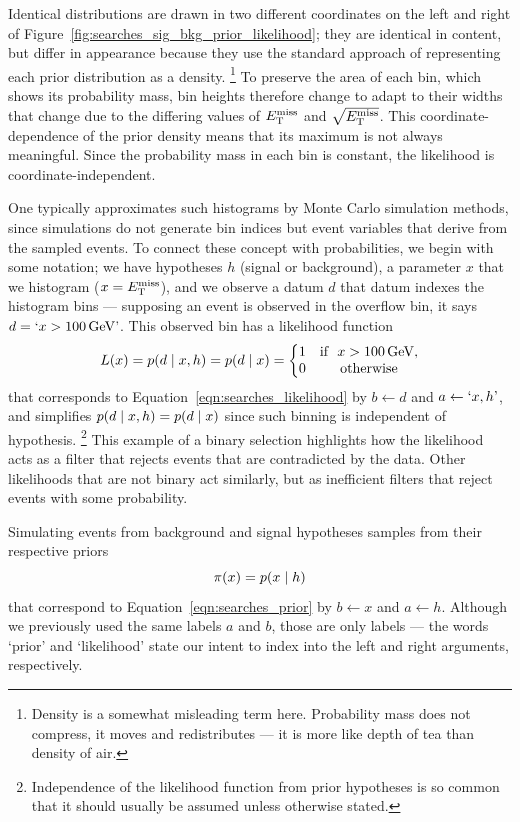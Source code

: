 Identical distributions are drawn in two different coordinates
on the left and right of Figure~\ref{fig:searches_sig_bkg_prior_likelihood};
they are identical in content, but differ in appearance because they use the
standard approach of representing each prior distribution as a density.%
\footnote{%
Density is a somewhat misleading term here.
Probability mass does not compress, it moves and redistributes --- it is more
like depth of tea than density of air.%
}
To preserve the area of each bin, which shows its probability mass,
bin heights therefore change to adapt to their widths that change due to the
differing values of $\met$ and $\sqrt{\met}$.
This coordinate-dependence of the prior density means that its maximum is
not always meaningful.
Since the probability mass in each bin is constant, the likelihood is
coordinate-independent.

One typically approximates such histograms by Monte Carlo simulation methods,
since simulations do not generate bin indices but event variables that derive
from the sampled events.
To connect these concept with probabilities, we begin with some notation;
we have hypotheses $h$ (signal or background),
a parameter $x$ that we histogram ($x = \met$),
and we observe a datum $d$ that datum indexes the histogram bins --- supposing
an event is observed in the overflow bin, it says
$d = `x > 100\,\eV[G]\textrm{'}$.
This observed bin has a likelihood function
\begin{equation}
L(x) = \prob{d}{x, h} = \prob{d}{x} =
\left\{
\begin{matrix}
1 & \textrm{if }~x > 100\,\eV[G], \\
0 & \textrm{otherwise} \\
\end{matrix}
\right.
\end{equation}
that corresponds to Equation~\ref{eqn:searches_likelihood} by
$b \leftarrow d$ and $a \leftarrow `x, h\textrm{'}$,
and simplifies $\prob{d}{x, h} = \prob{d}{x}$ since such binning is independent
of hypothesis.%
\footnote{%
Independence of the likelihood function from prior hypotheses is so common
that it should usually be assumed unless otherwise stated.
}
This example of a binary selection highlights how the likelihood acts as a
filter that rejects events that are contradicted by the data.
Other likelihoods that are not binary act similarly, but as inefficient filters
that reject events with some probability.

Simulating events from background and signal hypotheses samples from their
respective priors
\begin{equation}
\pi(x) = \prob{x}{h}
\end{equation}
that correspond to Equation~\ref{eqn:searches_prior} by
$b \leftarrow x$ and $a \leftarrow h$.
Although we previously used the same labels $a$ and $b$, those are only
labels --- the words `prior' and `likelihood' state our intent to index into
the left and right arguments, respectively.


